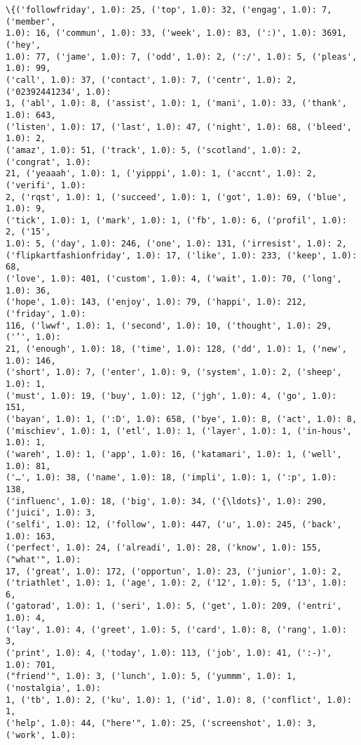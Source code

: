 \documentclass[11pt]{article}
\begin{document}
    \begin{Verbatim}[commandchars=\\\{\}]
\{('followfriday', 1.0): 25, ('top', 1.0): 32, ('engag', 1.0): 7, ('member',
1.0): 16, ('commun', 1.0): 33, ('week', 1.0): 83, (':)', 1.0): 3691, ('hey',
1.0): 77, ('jame', 1.0): 7, ('odd', 1.0): 2, (':/', 1.0): 5, ('pleas', 1.0): 99,
('call', 1.0): 37, ('contact', 1.0): 7, ('centr', 1.0): 2, ('02392441234', 1.0):
1, ('abl', 1.0): 8, ('assist', 1.0): 1, ('mani', 1.0): 33, ('thank', 1.0): 643,
('listen', 1.0): 17, ('last', 1.0): 47, ('night', 1.0): 68, ('bleed', 1.0): 2,
('amaz', 1.0): 51, ('track', 1.0): 5, ('scotland', 1.0): 2, ('congrat', 1.0):
21, ('yeaaah', 1.0): 1, ('yipppi', 1.0): 1, ('accnt', 1.0): 2, ('verifi', 1.0):
2, ('rqst', 1.0): 1, ('succeed', 1.0): 1, ('got', 1.0): 69, ('blue', 1.0): 9,
('tick', 1.0): 1, ('mark', 1.0): 1, ('fb', 1.0): 6, ('profil', 1.0): 2, ('15',
1.0): 5, ('day', 1.0): 246, ('one', 1.0): 131, ('irresist', 1.0): 2,
('flipkartfashionfriday', 1.0): 17, ('like', 1.0): 233, ('keep', 1.0): 68,
('love', 1.0): 401, ('custom', 1.0): 4, ('wait', 1.0): 70, ('long', 1.0): 36,
('hope', 1.0): 143, ('enjoy', 1.0): 79, ('happi', 1.0): 212, ('friday', 1.0):
116, ('lwwf', 1.0): 1, ('second', 1.0): 10, ('thought', 1.0): 29, ('’', 1.0):
21, ('enough', 1.0): 18, ('time', 1.0): 128, ('dd', 1.0): 1, ('new', 1.0): 146,
('short', 1.0): 7, ('enter', 1.0): 9, ('system', 1.0): 2, ('sheep', 1.0): 1,
('must', 1.0): 19, ('buy', 1.0): 12, ('jgh', 1.0): 4, ('go', 1.0): 151,
('bayan', 1.0): 1, (':D', 1.0): 658, ('bye', 1.0): 8, ('act', 1.0): 8,
('mischiev', 1.0): 1, ('etl', 1.0): 1, ('layer', 1.0): 1, ('in-hous', 1.0): 1,
('wareh', 1.0): 1, ('app', 1.0): 16, ('katamari', 1.0): 1, ('well', 1.0): 81,
('…', 1.0): 38, ('name', 1.0): 18, ('impli', 1.0): 1, (':p', 1.0): 138,
('influenc', 1.0): 18, ('big', 1.0): 34, ('{\ldots}', 1.0): 290, ('juici', 1.0): 3,
('selfi', 1.0): 12, ('follow', 1.0): 447, ('u', 1.0): 245, ('back', 1.0): 163,
('perfect', 1.0): 24, ('alreadi', 1.0): 28, ('know', 1.0): 155, ("what'", 1.0):
17, ('great', 1.0): 172, ('opportun', 1.0): 23, ('junior', 1.0): 2,
('triathlet', 1.0): 1, ('age', 1.0): 2, ('12', 1.0): 5, ('13', 1.0): 6,
('gatorad', 1.0): 1, ('seri', 1.0): 5, ('get', 1.0): 209, ('entri', 1.0): 4,
('lay', 1.0): 4, ('greet', 1.0): 5, ('card', 1.0): 8, ('rang', 1.0): 3,
('print', 1.0): 4, ('today', 1.0): 113, ('job', 1.0): 41, (':-)', 1.0): 701,
("friend'", 1.0): 3, ('lunch', 1.0): 5, ('yummm', 1.0): 1, ('nostalgia', 1.0):
1, ('tb', 1.0): 2, ('ku', 1.0): 1, ('id', 1.0): 8, ('conflict', 1.0): 1,
('help', 1.0): 44, ("here'", 1.0): 25, ('screenshot', 1.0): 3, ('work', 1.0):

\end{Verbatim}
\end{document}
